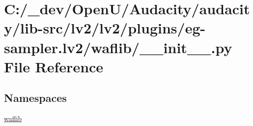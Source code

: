 \hypertarget{lv2_2lv2_2plugins_2eg-sampler_8lv2_2waflib_2____init_____8py}{}\section{C\+:/\+\_\+dev/\+Open\+U/\+Audacity/audacity/lib-\/src/lv2/lv2/plugins/eg-\/sampler.lv2/waflib/\+\_\+\+\_\+init\+\_\+\+\_\+.py File Reference}
\label{lv2_2lv2_2plugins_2eg-sampler_8lv2_2waflib_2____init_____8py}
\subsection*{Namespaces}
\begin{DoxyCompactItemize}
\item 
 \hyperlink{namespacewaflib}{waflib}
\end{DoxyCompactItemize}

